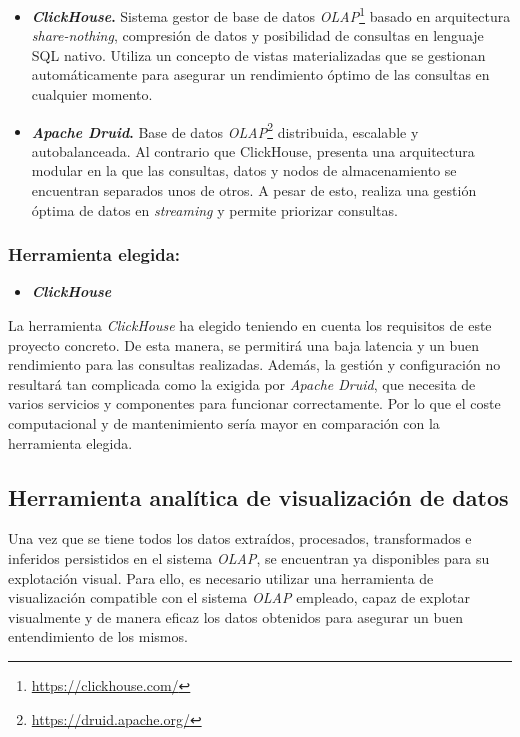 \begin{itemize}
    \item \textbf{\textit{ClickHouse}.} Sistema gestor de base de datos \textit{OLAP}\footnote{\url{https://clickhouse.com/}} basado en arquitectura \textit{share-nothing}, compresión de datos y posibilidad de consultas en lenguaje SQL nativo. Utiliza un concepto de vistas materializadas que se gestionan automáticamente para asegurar un rendimiento óptimo de las consultas en cualquier momento.
    
    \item \textbf{\textit{Apache Druid}.} Base de datos \textit{OLAP}\footnote{\url{https://druid.apache.org/}} distribuida, escalable y autobalanceada. Al contrario que ClickHouse, presenta una arquitectura modular en la que las consultas, datos y nodos de almacenamiento se encuentran separados unos de otros. A pesar de esto, realiza una gestión óptima de datos en \textit{streaming} y permite priorizar consultas.
\end{itemize}

\subsubsection{Herramienta elegida:}

\begin{itemize}
    \item \textbf{\textit{ClickHouse}}
\end{itemize}

La herramienta \textit{ClickHouse} ha elegido teniendo en cuenta los requisitos de este proyecto concreto. De esta manera, se permitirá una baja latencia y un buen rendimiento para las consultas realizadas. Además, la gestión y configuración no resultará tan complicada como la exigida por \textit{Apache Druid}, que necesita de varios servicios y componentes para funcionar correctamente. Por lo que el coste computacional y de mantenimiento sería mayor en comparación con la herramienta elegida.

\subsection{Herramienta analítica de visualización de datos}

Una vez que se tiene todos los datos extraídos, procesados, transformados e inferidos persistidos en el sistema \textit{OLAP}, se encuentran ya disponibles para su explotación visual. Para ello, es necesario utilizar una herramienta de visualización compatible con el sistema \textit{OLAP} empleado, capaz de explotar visualmente y de manera eficaz los datos obtenidos para asegurar un buen entendimiento de los mismos.

